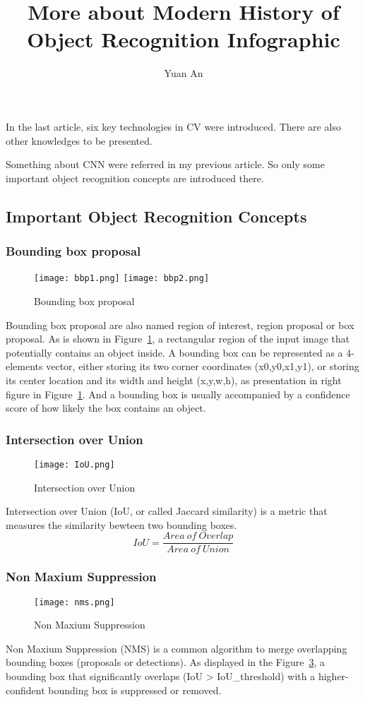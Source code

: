 \documentclass[a4paper,12pt,twocolumn]{article}
\title{More about Modern History of Object Recognition Infographic}
\author{Yuan An}
\begin{document}
\maketitle
In the last article, six key technologies in CV were introduced. There are also other knowledges to be presented. 
\par
Something about CNN were referred in my previous article. So only some important object recognition concepts are introduced there.
\subsection*{Important Object Recognition Concepts\cite{MHoOR}}
\subsubsection*{Bounding box proposal}
\begin{figure}[h]
	\centering
	\texttt{[image: bbp1.png]}
	\qquad
	\texttt{[image: bbp2.png]}
	\caption{Bounding box proposal}\label{bbp}
\end{figure}
\par
Bounding box proposal are also named region of interest, region proposal or box proposal. As is shown in Figure~\ref{bbp}, a rectangular region of the input image that potentially contains an object inside. A bounding box can be represented as a 4-elements vector, either storing its two corner coordinates (x0,y0,x1,y1), or storing its center location and its width and height (x,y,w,h), as presentation in right figure in Figure~\ref{bbp}. And a bounding box is usually accompanied by a confidence score of how likely the box contains an object.
\subsubsection*{Intersection over Union}
\begin{figure}[h]
	\centering
	\texttt{[image: IoU.png]}
	\caption{Intersection over Union}\label{iou}
\end{figure}
\par
Intersection over Union (IoU, or called Jaccard similarity) is a metric that measures the similarity bewteen two bounding boxes.
\begin{equation*}
	IoU = \frac{Area\ of\ Overlap}{Area\ of\ Union} 
\end{equation*}
\subsubsection*{Non Maxium Suppression}
\begin{figure}[h]
	\centering
	\texttt{[image: nms.png]}
	\caption{Non Maxium Suppression}\label{nms}
\end{figure}
\par
Non Maxium Suppression (NMS) is a common algorithm to merge overlapping bounding boxes (proposals or detections). As displayed in the Figure~\ref{nms}, a bounding box that significantly overlaps (IoU > IoU\_threshold) with a higher-confident bounding box is suppressed or removed.
\end{document}
